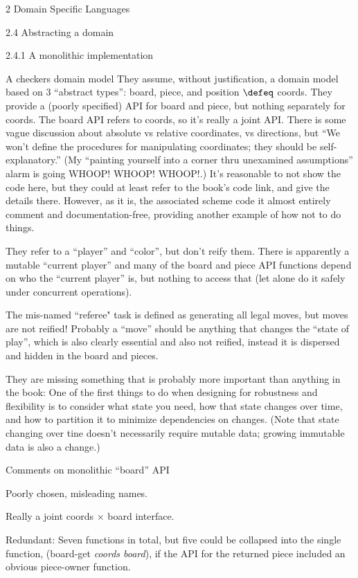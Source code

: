 \documentclass[12pt]{PalisadesLakesBook}
\begin{document}
\begin{plSection}{2 Domain Specific Languages}
\begin{plSection}{2.4 Abstracting a domain}
\begin{plSection}{2.4.1 A monolithic implementation}
\begin{plSection}{A checkers domain model}
They assume, without justification, a domain model based
on 3 ``abstract types'': 
{\schemeFont board}, {\schemeFont piece},
and position $\defeq$ {\schemeFont coords}.
They provide a (poorly specified) API for 
{\schemeFont board} and {\schemeFont piece},
but nothing separately for {\schemeFont coords}.
The {\schemeFont board} API refers to {\schemeFont coords},
so it's really a joint API.
There is some vague discussion about 
absolute vs relative coordinates,
vs directions, but
``We won't define the procedures for manipulating coordinates;
they should be self-explanatory.''
(My ``painting yourself into a corner thru unexamined 
assumptions'' alarm is going 
WHOOP! WHOOP! WHOOP!.)
It's reasonable to not show the code here,
but they could at least refer to the book's code link,
and give the details there.
However, as it is, the associated scheme code it almost entirely
comment and documentation-free, providing another example
of how not to do things.

They refer to a ``player'' and ``color'', but don't reify them.
There is apparently a mutable ``current player'' 
and many of the {\schemeFont board} and {\schemeFont piece}
API functions depend on who the ``current player'' is,
but nothing to access that (let alone do it safely under 
concurrent operations).

The mis-named ``referee" task is defined as generating all legal
moves, but moves are not reified!
Probably a ``move'' should be anything that changes the
``state of play'', 
which is also clearly essential and also not reified,
instead it is dispersed and hidden in the board and pieces.

They are missing something that is probably more important 
than anything in the book:
One of the first things to do when designing for robustness and
flexibility is to consider what state you need,
how that state changes over time, 
and how to partition it to minimize dependencies on changes.
(Note that state changing over tine doesn't necessarily require
mutable data; growing immutable data is also a change.)

\begin{plSection}{Comments on monolithic ``board'' API}

Poorly chosen, misleading names.

Really a joint {\schemeFont coords} $\times$ {\schemeFont board}
interface.

Redundant: Seven functions in total, 
but five could be collapsed into the single function, 
{\schemeFont (board-get {\itshape coords board})},
if the API for the returned {\schemeFont piece} included
an obvious {\schemeFont piece-owner} function.
 

\end{plSection}
\end{plSection}
\end{plSection}
\end{plSection}
\end{plSection}
\end{document}

